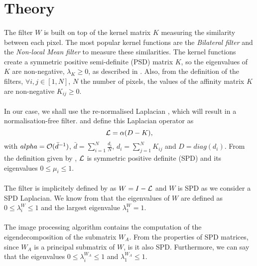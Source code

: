 \section{Theory}

\paragraph{}
The filter \(W\) is built on top of the kernel matrix \(K\) measuring the similarity between each pixel.
The most popular kernel functions are the \textit{Bilateral filter} \cite{bilateral_tomasi_1998} and the \textit{Non-local Mean filter} \cite{kervrann_nlm_2006} to measure these similarities.
The kernel functions create a symmetric positive semi-definite (PSD) matrix \(K\), so the eigenvalues of \(K\) are non-negative, \(\lambda_K \ge 0\), as described in \cite{talebi_fast_2016}.
Also, from the definition of the filters, \(\forall i, j \in [1, N]\), \(N\) the number of pixels, the values of the affinity matrix \(K\) are non-negative \(K_{ij} \ge 0\).

\paragraph{}
In our case, we shall use the re-normalised Laplacian \cite{siam_slides_2016}, which will result in a normalisation-free filter.
\cite{siam_slides_2016} and \cite{milanfar_new_2016} define this Laplacian operator as
\[\operatorname{\mathcal{L}} = \alpha (D - K),\]
with \(alpha = \operatorname{\mathcal{O}} (\bar{d}^{-1})\), \(\bar{d} = \sum^N_{i=1} \frac{d_i}{N}\), \(d_i = \sum^N_{j=1} K_{ij}\) and \(D = diag(d_i)\).
From the definition given by \cite{siam_slides_2016}, \(\operatorname{\mathcal{L}}\) is symmetric positive definite (SPD) and its eigenvalues \(0 \le \mu_i \le 1\).

\paragraph{}
The filter is implicitely defined by \cite{modern_tour_2013} as \(W = I - \operatorname{\mathcal{L}}\) and \(W\) is SPD as we consider a SPD Laplacian.
We know from \cite{glide_2014} that the eigenvalues of \(W\) are defined as \(0 \le \lambda^W_i \le 1\) and the largest eigenvalue \(\lambda^W_1 = 1\).

\paragraph{}
The image processing algorithm contains the computation of the eigendecomposition of the submatrix \(W_A\).
From the properties of SPD matrices, since \(W_A\) is a principal submatrix of \(W\), is it also SPD.
Furthermore, we can say that the eigenvalues \(0 \le \lambda^{W_A}_i \le 1\) and \(\lambda^{W_A}_1 \le 1\).

